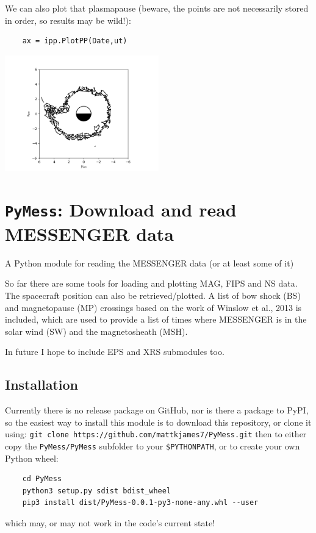 	We can also plot that plasmapause (beware, the points are not necessarily stored in order, so results may be wild!):
	\begin{verbatim}
	ax = ipp.PlotPP(Date,ut)
	\end{verbatim}
	\includegraphics[width=0.5\textwidth]{figures/ch4_ppexample.png}
	


	\section{\texttt{PyMess}: Download and read MESSENGER data}

	A Python module for reading the MESSENGER data (or at least some of it)
	
	So far there are some tools for loading and plotting MAG, FIPS and NS data. The 
	spacecraft position can also be retrieved/plotted. A list of bow shock (BS) and
	magnetopause (MP) crossings based on the work of Winslow et al., 2013 is 
	included, which are used to provide a list of times where MESSENGER is in the 
	solar wind (SW) and the magnetosheath (MSH).
	
	In future I hope to include EPS and XRS submodules too.
	
	\subsection{Installation}
	
	Currently there is no release package on GitHub, nor is there a package 
	to PyPI, so the easiest way to install this module is to download this 
	repository, or clone it using:
	\texttt{git clone https://github.com/mattkjames7/PyMess.git}
	then to either copy the \texttt{PyMess/PyMess} subfolder to your \texttt{\$PYTHONPATH}, or 
	to create your own Python wheel:
	\begin{verbatim}
	cd PyMess
	python3 setup.py sdist bdist_wheel
	pip3 install dist/PyMess-0.0.1-py3-none-any.whl --user
	\end{verbatim}
	which may, or may not work in the code's current state!
	
